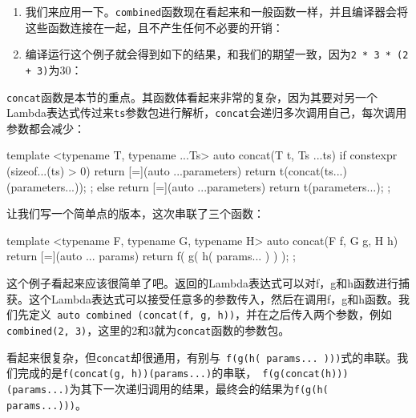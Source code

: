 \begin{enumerate}
\begin{codebox}[cpp]
auto combined (
    concat(twice, thrice, std::plus<int>{})
);
\end{codebox}

\item 我们来应用一下。\texttt{combined}函数现在看起来和一般函数一样，并且编译器会将这些函数连接在一起，且不产生任何不必要的开销：

\begin{codebox}[cpp]
    std::cout << combined(2, 3) << '\n';
}
\end{codebox}

\item 编译运行这个例子就会得到如下的结果，和我们的期望一致，因为\texttt{2 * 3 * (2 + 3)}为30：


\end{enumerate}


\texttt{concat}函数是本节的重点。其函数体看起来非常的复杂，因为其要对另一个Lambda表达式传过来\texttt{ts}参数包进行解析，\texttt{concat}会递归多次调用自己，每次调用参数都会减少：

\begin{codebox}[cpp]
template <typename T, typename ...Ts>
auto concat(T t, Ts ...ts)
{
    if constexpr (sizeof...(ts) > 0) {
        return [=](auto ...parameters) {
            return t(concat(ts...)(parameters...));
        };
    } else {
        return [=](auto ...parameters) {
            return t(parameters...);
        };
    }
}
\end{codebox}

让我们写一个简单点的版本，这次串联了三个函数：

\begin{codebox}[cpp]
template <typename F, typename G, typename H>
auto concat(F f, G g, H h)
{
    return [=](auto ... params) {
        return f( g( h( params... ) ) );
    };
}
\end{codebox}

这个例子看起来应该很简单了吧。返回的Lambda表达式可以对f，g和h函数进行捕获。这个Lambda表达式可以接受任意多的参数传入，然后在调用f，g和h函数。我们先定义\texttt{ auto combined (concat(f, g, h))}，并在之后传入两个参数，例如\texttt{combined(2, 3)}，这里的2和3就为\texttt{concat}函数的参数包。

看起来很复杂，但\texttt{concat}却很通用，有别与\texttt{ f(g(h( params... )))}式的串联。我们完成的是\texttt{f(concat(g, h))(params...)}的串联，\texttt{ f(g(concat(h)))(params...)}为其下一次递归调用的结果，最终会的结果为\texttt{f(g(h( params...)))}。


